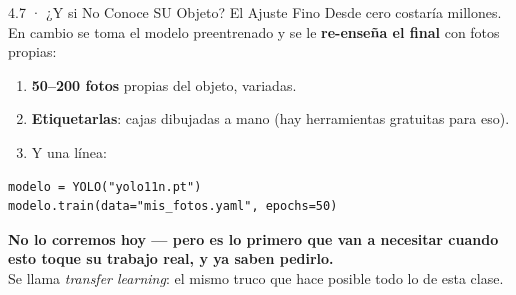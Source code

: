 \documentclass[aspectratio=169, 11pt]{beamer}
\begin{document}
\begin{frame}[fragile, shrink=5]{4.7 · ¿Y si No Conoce SU Objeto? El Ajuste Fino}
  \vspace{2pt}
  {\footnotesize\color{textMuted}
   Desde cero costaría millones. En cambio se toma el modelo preentrenado y
   se le \textbf{re-enseña el final} con fotos propias:}
  \vspace{2pt}
  {\footnotesize\color{textMuted}
  \begin{enumerate}\setlength{\itemsep}{2pt}
    \item \textbf{50--200 fotos} propias del objeto, variadas.
    \item \textbf{Etiquetarlas}: cajas dibujadas a mano (hay herramientas
          gratuitas para eso).
    \item Y una línea:
  \end{enumerate}}
  \begin{verbatim}
modelo = YOLO("yolo11n.pt")
modelo.train(data="mis_fotos.yaml", epochs=50)
  \end{verbatim}
  \vspace{2pt}
  \begin{tcolorbox}[colback=arcaGray, colframe=codeGreen, boxrule=0pt,
    leftrule=4pt, arc=3pt, left=10pt, right=10pt, top=4pt, bottom=4pt]
    {\scriptsize\color{arcaDark}\bfseries
     No lo corremos hoy --- pero es lo primero que van a necesitar cuando
     esto toque su trabajo real, y ya saben pedirlo.}\\[2pt]
    {\scriptsize\color{textMuted}
     Se llama \emph{transfer learning}: el mismo truco que hace posible
     todo lo de esta clase.}
  \end{tcolorbox}
\end{frame}
\end{document}
